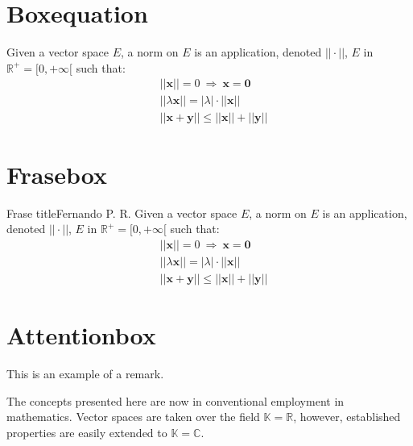 
\section{Boxequation}

\begin{boxequation}
Given a vector space $E$, a norm on $E$ is an application, denoted $||\cdot||$, $E$ in $\mathbb{R}^+=[0,+\infty[$ such that:
\begin{align}
& ||\mathbf{x}||=0\ \Rightarrow\ \mathbf{x}=\mathbf{0}\\
& ||\lambda \mathbf{x}||=|\lambda|\cdot ||\mathbf{x}||\\
& ||\mathbf{x}+\mathbf{y}||\leq ||\mathbf{x}||+||\mathbf{y}||
\end{align}
\end{boxequation}


\section{Frasebox}

\begin{frasebox}{Frase title}{Fernando P. R.}
Given a vector space $E$, a norm on $E$ is an application, denoted $||\cdot||$, $E$ in $\mathbb{R}^+=[0,+\infty[$ such that:
\begin{align}
& ||\mathbf{x}||=0\ \Rightarrow\ \mathbf{x}=\mathbf{0}\\
& ||\lambda \mathbf{x}||=|\lambda|\cdot ||\mathbf{x}||\\
& ||\mathbf{x}+\mathbf{y}||\leq ||\mathbf{x}||+||\mathbf{y}||
\end{align}
\end{frasebox}

\section{Attentionbox}

This is an example of a remark.

\begin{attentionbox}
The concepts presented here are now in conventional employment in mathematics. 
Vector spaces are taken over the field $\mathbb{K}=\mathbb{R}$, however, established properties are easily extended to $\mathbb{K}=\mathbb{C}$.
\end{attentionbox}

